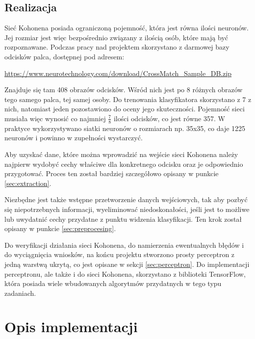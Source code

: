 \documentclass[12pt, notitlepage]{article}
\begin{document}
\subsection{Realizacja}

Sieć Kohonena posiada ograniczoną pojemność, która jest równa ilości neuronów. Jej rozmiar jest więc bezpośrednio związany z ilością osób, które mają być rozpoznawane. Podczas pracy nad projektem skorzystano z darmowej bazy odcisków palca, dostępnej pod adresem:
    \begin{center}
        \url{
            https://www.neurotechnology.com/download/CrossMatch_Sample_DB.zip
        }
    \end{center}
Znajduje się tam 408 obrazów odcisków. Wśród nich jest po 8 różnych obrazów tego samego palca, tej samej osoby. Do trenowania klasyfikatora skorzystano z 7 z nich, natomiast jeden pozostawiono do oceny jego skuteczności. Pojemność sieci musiała więc wynosić co najmniej \( \frac{7}{8} \) ilości odcisków, co jest równe 357. W praktyce wykorzystywano siatki neuronów o rozmiarach np. 35x35, co daje 1225 neuronów i powinno w zupełności wystarczyć.

Aby uzyskać dane, które można wprowadzić na wejście sieci Kohonena należy najpierw wydobyć cechy właściwe dla konkretnego odcisku oraz je odpowiednio przygotować. Proces ten został bardziej szczegółowo opisany w punkcie \ref{sec:extraction}.

Niezbędne jest także wstępne przetworzenie danych wejściowych, tak aby pozbyć się niepotrzebnych informacji, wyeliminować niedoskonałości, jeśli jest to możliwe lub uwydatnić cechy przydatne z punktu widzenia klasyfikacji. Ten krok został opisany w punkcie \ref{sec:preprocesing}.

Do weryfikacji działania sieci Kohonena, do namierzenia ewentualnych błędów i do wyciągnięcia wniosków, na końcu projektu stworzono prosty perceptron z jedną warstwą ukrytą, co jest opisane w sekcji \ref{sec:perceptron}. Do implementacji perceptronu, ale także i do sieci Kohonena, skorzystano z biblioteki TensorFlow, która posiada wiele wbudowanych algorytmów przydatnych w tego typu zadaniach. 

\newpage
\section{Opis implementacji}
\end{document}
